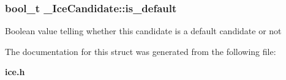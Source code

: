 \subsubsection[{is\-\_\-default}]{\setlength{\rightskip}{0pt plus 5cm}bool\-\_\-t \-\_\-\-Ice\-Candidate\-::is\-\_\-default}\label{struct__IceCandidate_aa326e8dca696ab5311c8316133da5937}
Boolean value telling whether this candidate is a default candidate or not 

The documentation for this struct was generated from the following file\-:\begin{DoxyCompactItemize}
\item 
{\bf ice.\-h}\end{DoxyCompactItemize}
